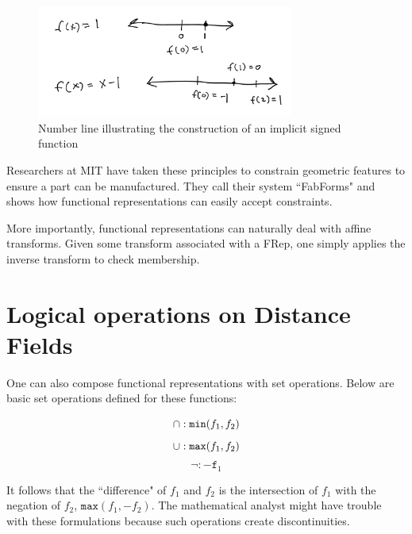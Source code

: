 \begin{figure}[h!]
  \centering
    \includegraphics[width=0.75\textwidth]{img/implicit_sketch.png}
  \caption{Number line illustrating the construction of an implicit signed function}
  \label{fig:implicit-sketch}
\end{figure}

Researchers at MIT have taken these principles to constrain
geometric features to ensure a part can be manufactured.\cite{Shugrina_Shamir_Matusik_2015}
They call their system ``FabForms" and shows how functional representations
can easily accept constraints.

More importantly, functional representations can naturally deal with affine
transforms. \cite{Henderson_2002} Given some transform associated with a
FRep, one simply applies the inverse transform to check membership.

\section{Logical operations on Distance Fields}


One can also compose functional representations with set operations. 
Below are basic set operations defined for these functions:

\begin{equation*}
\cap : \mathtt{min}(f_1,f_2) \\
\end{equation*}
\begin{equation*}
\cup : \mathtt{max}(f_1,f_2) \\
\end{equation*}
\begin{equation*}
\neg : -\mathtt{f}_1
\end{equation*}

It follows that the ``difference"
of $f_1$ and $f_2$ is the intersection of $f_1$ with the negation of $f_2$,
$\mathtt{max}(f_1,-f_2)$.
The mathematical analyst might have trouble with these formulations because
such operations
create discontinuities.


